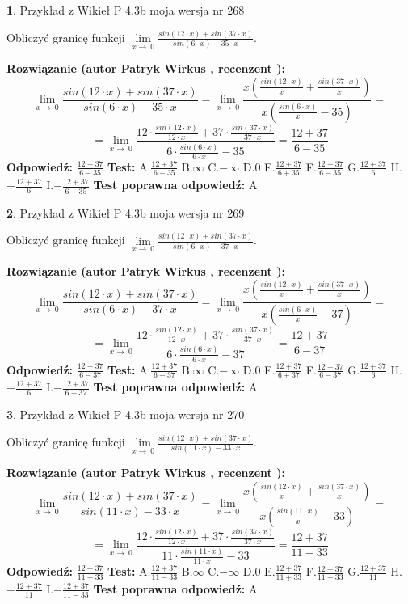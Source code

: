\documentclass[12pt, a4paper]{article}
\theoremstyle{definition} %
\newtheorem{zad}{}
\newcommand{\zadStart}[1]{\begin{zad}#1\newline}
\newcommand{\zadStop}{\end{zad}}
\newcommand{\rozwStart}[2]{\noindent \textbf{Rozwiązanie (autor #1 , recenzent #2): }\newline}
\newcommand{\rozwStop}{\newline}
\newcommand{\odpStart}{\noindent \textbf{Odpowiedź:}\newline}
\newcommand{\odpStop}{\newline}
\newcommand{\testStart}{\noindent \textbf{Test:}\newline}
\newcommand{\testStop}{\newline}
\newcommand{\kluczStart}{\noindent \textbf{Test poprawna odpowiedź:}\newline}
\newcommand{\kluczStop}{\newline}
\begin{document}
\zadStart{Przykład z Wikieł P 4.3b moja wersja nr 268}


Obliczyć granicę funkcji $\lim\limits_{x\to\ 0}\frac{sin(12 \cdot x)+sin(37 \cdot x)}{sin(6 \cdot x)-35 \cdot x}$.
\zadStop
\rozwStart{Patryk Wirkus}{}
$$\lim\limits_{x\to\ 0}\frac{sin(12 \cdot x)+sin(37 \cdot x)}{sin(6 \cdot x)-35 \cdot x}=\lim\limits_{x\to\ 0}\frac{x(\frac{sin(12 \cdot x)}{x}+\frac{sin(37 \cdot x)}{x})}{x(\frac{sin(6 \cdot x)}{x}-35)}=$$
$$=\lim\limits_{x\to\ 0}\frac{12 \cdot \frac{sin(12 \cdot x)}{12 \cdot x}+37 \cdot \frac{sin(37 \cdot x)}{37 \cdot x}}{6 \cdot \frac{sin(6 \cdot x)}{6 \cdot x}-35}=\frac{12+37}{6-35}$$
\rozwStop
\odpStart
$\frac{12+37}{6-35}$
\odpStop
\testStart
A.$\frac{12+37}{6-35}$
B.$\infty$
C.$-\infty$
D.$0$
E.$\frac{12+37}{6+35}$
F.$\frac{12-37}{6-35}$
G.$\frac{12+37}{6}$
H.$-\frac{12+37}{6}$
I.$-\frac{12+37}{6-35}$
\testStop
\kluczStart
A
\kluczStop



\zadStart{Przykład z Wikieł P 4.3b moja wersja nr 269}


Obliczyć granicę funkcji $\lim\limits_{x\to\ 0}\frac{sin(12 \cdot x)+sin(37 \cdot x)}{sin(6 \cdot x)-37 \cdot x}$.
\zadStop
\rozwStart{Patryk Wirkus}{}
$$\lim\limits_{x\to\ 0}\frac{sin(12 \cdot x)+sin(37 \cdot x)}{sin(6 \cdot x)-37 \cdot x}=\lim\limits_{x\to\ 0}\frac{x(\frac{sin(12 \cdot x)}{x}+\frac{sin(37 \cdot x)}{x})}{x(\frac{sin(6 \cdot x)}{x}-37)}=$$
$$=\lim\limits_{x\to\ 0}\frac{12 \cdot \frac{sin(12 \cdot x)}{12 \cdot x}+37 \cdot \frac{sin(37 \cdot x)}{37 \cdot x}}{6 \cdot \frac{sin(6 \cdot x)}{6 \cdot x}-37}=\frac{12+37}{6-37}$$
\rozwStop
\odpStart
$\frac{12+37}{6-37}$
\odpStop
\testStart
A.$\frac{12+37}{6-37}$
B.$\infty$
C.$-\infty$
D.$0$
E.$\frac{12+37}{6+37}$
F.$\frac{12-37}{6-37}$
G.$\frac{12+37}{6}$
H.$-\frac{12+37}{6}$
I.$-\frac{12+37}{6-37}$
\testStop
\kluczStart
A
\kluczStop



\zadStart{Przykład z Wikieł P 4.3b moja wersja nr 270}


Obliczyć granicę funkcji $\lim\limits_{x\to\ 0}\frac{sin(12 \cdot x)+sin(37 \cdot x)}{sin(11 \cdot x)-33 \cdot x}$.
\zadStop
\rozwStart{Patryk Wirkus}{}
$$\lim\limits_{x\to\ 0}\frac{sin(12 \cdot x)+sin(37 \cdot x)}{sin(11 \cdot x)-33 \cdot x}=\lim\limits_{x\to\ 0}\frac{x(\frac{sin(12 \cdot x)}{x}+\frac{sin(37 \cdot x)}{x})}{x(\frac{sin(11 \cdot x)}{x}-33)}=$$
$$=\lim\limits_{x\to\ 0}\frac{12 \cdot \frac{sin(12 \cdot x)}{12 \cdot x}+37 \cdot \frac{sin(37 \cdot x)}{37 \cdot x}}{11 \cdot \frac{sin(11 \cdot x)}{11 \cdot x}-33}=\frac{12+37}{11-33}$$
\rozwStop
\odpStart
$\frac{12+37}{11-33}$
\odpStop
\testStart
A.$\frac{12+37}{11-33}$
B.$\infty$
C.$-\infty$
D.$0$
E.$\frac{12+37}{11+33}$
F.$\frac{12-37}{11-33}$
G.$\frac{12+37}{11}$
H.$-\frac{12+37}{11}$
I.$-\frac{12+37}{11-33}$
\testStop
\kluczStart
A
\kluczStop
\end{document}

